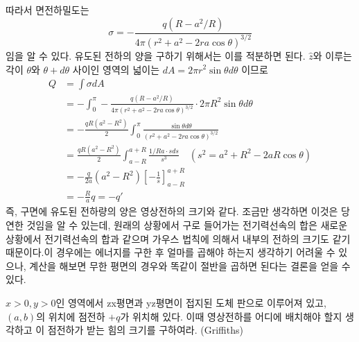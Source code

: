 따라서 면전하밀도는 
\begin{equation}
\sigma = -\frac{q(R-a^2/R)}{4\pi(r^2+a^2-2ra\cos\theta)^{3/2}}
\end{equation}임을 알 수 있다. 유도된 전하의 양을 구하기 위해서는 이를 적분하면 된다.
$\hat{z}$와 이루는 각이 $\theta$와 $\theta+d\theta$ 사이인 영역의 넓이는 $dA = 2\pi r^2 \sin\theta d\theta$ 이므로
\begin{align}
Q &= \int \sigma dA \\
&= -\int_0^\pi  -\frac{q(R-a^2/R)}{4\pi(r^2+a^2-2ra\cos\theta)^{3/2}} \cdot 2\pi R^2 \sin\theta d\theta \\
&= -\frac{qR(a^2-R^2)}{2}\int_0^\pi \frac{\sin\theta d\theta}{(r^2+a^2-2ra\cos\theta)^{3/2}}\\
&= \frac{qR(a^2-R^2)}{2} \int_{a-R}^{a+R} \frac{1/Ra \cdot sds}{s^3}\quad (s^2 = a^2 + R^2 -2aR\cos\theta)\\
&=-\frac{q}{2a}(a^2-R^2)\left [-\frac{1}{s}\right ]^{a+R}_{a-R}\\
&= -\frac{R}{a}q = -q'
\end{align}
즉, 구면에 유도된 전하량의 양은 영상전하의 크기와 같다. 조금만 생각하면 이것은 당연한 것임을 알 수 있는데, 원래의 상황에서 구로 들어가는 전기력선속의 합은 새로운 상황에서 전기력선속의 합과 같으며 가우스 법칙에 의해서 내부의 전하의 크기도 같기 때문이다.이 경우에는 에너지를 구한 후 얼마를 곱해야 하는지 생각하기 어려울 수 있으나, 계산을 해보면 무한 평면의 경우와 똑같이 절반을 곱하면 된다는 결론을 얻을 수 있다.
\begin{problem}\label{image_charge_4}
$x>0, y>0$인 영역에서 zx평면과 yz평면이 접지된 도체 판으로 이루어져 있고, $(a,b)$의 위치에 점전하 $+q$가 위치해 있다. 이때 영상전하를 어디에 배치해야 할지 생각하고 이 점전하가 받는 힘의 크기를 구하여라. (Griffiths) 
\end{problem}

